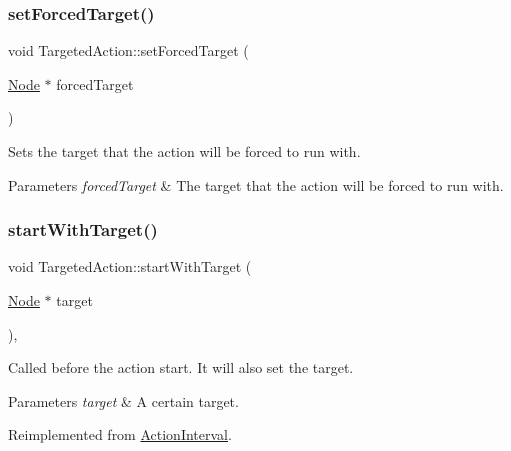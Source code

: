 \subsubsection{\texorpdfstring{set\+Forced\+Target()}{setForcedTarget()}\hspace{0.1cm}{\footnotesize\ttfamily [2/2]}}
{\footnotesize\ttfamily void Targeted\+Action\+::set\+Forced\+Target (\begin{DoxyParamCaption}\item[{\hyperlink{classNode}{Node} $\ast$}]{forced\+Target }\end{DoxyParamCaption})}

Sets the target that the action will be forced to run with.


\begin{DoxyParams}{Parameters}
{\em forced\+Target} & The target that the action will be forced to run with. \\
\hline
\end{DoxyParams}
\mbox{\label{classTargetedAction_a4e8be95b436457dd7b297f02ca5bf842}} 
\subsubsection{\texorpdfstring{start\+With\+Target()}{startWithTarget()}\hspace{0.1cm}{\footnotesize\ttfamily [1/2]}}
{\footnotesize\ttfamily void Targeted\+Action\+::start\+With\+Target (\begin{DoxyParamCaption}\item[{\hyperlink{classNode}{Node} $\ast$}]{target }\end{DoxyParamCaption})\hspace{0.3cm}{\ttfamily [override]}, {\ttfamily [virtual]}}

Called before the action start. It will also set the target.


\begin{DoxyParams}{Parameters}
{\em target} & A certain target. \\
\hline
\end{DoxyParams}


Reimplemented from \hyperlink{classActionInterval_ad3d91186b2c3108488ddbbdbbd982484}{Action\+Interval}.

\mbox{\label{classTargetedAction_a7fe60b527a5f01a0bf36e7fc41157d11}} 
